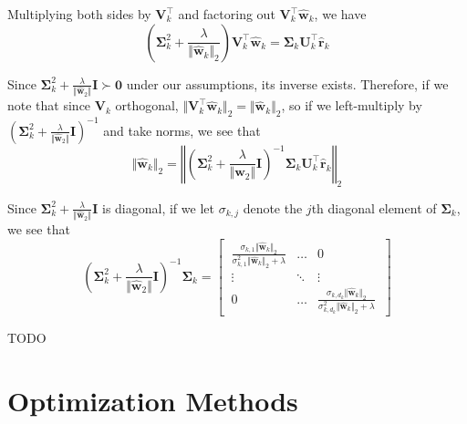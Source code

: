 \documentclass{article}
\numberwithin{equation}{section}
\begin{document}
Multiplying both sides by $ \mathbf{V}_k^\top $ and factoring out
$ \mathbf{V}_k^\top\hat{\mathbf{w}}_k $, we have
\begin{equation*}
    \left(
        \mathbf{\Sigma}_k^2 + \frac{\lambda}{\Vert\hat{\mathbf{w}}_k\Vert_2}
    \right)
    \mathbf{V}_k^\top\hat{\mathbf{w}}_k =
    \mathbf{\Sigma}_k\mathbf{U}_k^\top\hat{\mathbf{r}}_k
\end{equation*}

Since $ \mathbf{\Sigma}_k^2 +
\frac{\lambda}{\Vert\hat{\mathbf{w}}_2\Vert}\mathbf{I} \succ \mathbf{0} $
under our assumptions, its inverse exists. Therefore, if we note that since
$ \mathbf{V}_k $ orthogonal,
$ \Vert\mathbf{V}_k^\top\hat{\mathbf{w}}_k\Vert_2 =
\Vert\hat{\mathbf{w}}_k\Vert_2 $, so if we left-multiply by
$ \left(\mathbf{\Sigma}_k^2 +
\frac{\lambda}{\Vert\hat{\mathbf{w}}_2\Vert}\mathbf{I}\right)^{-1} $ and take
norms, we see that
\begin{equation*}
    \Vert\hat{\mathbf{w}}_k\Vert_2 =
    \left\Vert
        \left(
            \mathbf{\Sigma}_k^2 +
            \frac{\lambda}{\Vert\hat{\mathbf{w}}_2\Vert}\mathbf{I}
        \right)^{-1}
        \mathbf{\Sigma}_k\mathbf{U}_k^\top\hat{\mathbf{r}}_k
    \right\Vert_2
\end{equation*}

Since $ \mathbf{\Sigma}_k^2 +
\frac{\lambda}{\Vert\hat{\mathbf{w}}_2\Vert}\mathbf{I} $ is diagonal, if we
let $ \sigma_{k, j} $ denote the $ j $th diagonal element of
$ \mathbf{\Sigma}_k $, we see that
\begin{equation}
    \left(
        \mathbf{\Sigma}_k^2 +
        \frac{\lambda}{\Vert\hat{\mathbf{w}}_2\Vert}\mathbf{I}
    \right)^{-1}
    \mathbf{\Sigma}_k =
    \begin{bmatrix}
        \ \frac{
            \sigma_{k, 1}\Vert\hat{\mathbf{w}}_k\Vert_2
        }{
            \sigma_{k, 1}^2\Vert\hat{\mathbf{w}}_k\Vert_2 + \lambda
        }
        & \ldots & 0
        \ \\
        \ \vdots & \ddots & \vdots \ \\
        \ 0 & \ldots &
        \frac{
            \sigma_{k, d_k}\Vert\hat{\mathbf{w}}_k\Vert_2
        }{
            \sigma_{k, d_k}^2\Vert\hat{\mathbf{w}}_k\Vert_2 + \lambda
        } \
    \end{bmatrix}
\end{equation}

TODO

\section{Optimization Methods}
\end{document}
